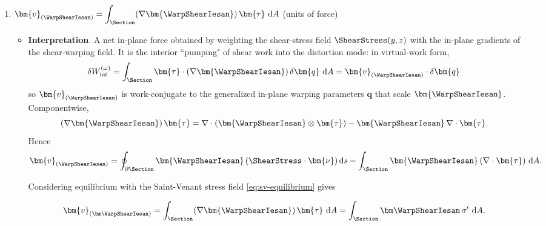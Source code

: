 \begin{enumerate}
So in view of the BVP for \(\bm\WarpShearIesan\) and the parameter \(\bm{b}_{\Section}\) fixed, \(\int_{\Section}G\,\nabla(\bm\WarpShearIesan\cdot\bm{b}_{\Section})\mathrm{~d}A = \left(\int_{\Section} E\, \bm{r}\otimes\bm{r}\mathrm{~d}A\right)\bm{b}_{\Section}\). 


\item \(\displaystyle \bm{v}_{(\WarpShearIesan)}=\int_{\Section}(\nabla\bm{\WarpShearIesan})\,\bm{\tau}\mathrm{~d}A\) (units of force) 
\begin{itemize}
\item \textbf{Interpretation}. A net in-plane force obtained by weighting the shear-stress field \(\ShearStress(y,z)\) with the in-plane gradients of the shear-warping field. 
It is the interior ``pumping" of shear work into the distortion mode: in virtual-work form,
  \[
  \delta W_{\text{int}}^{(\omega)}=\int_{\Section}\bm{\tau}\cdot(\nabla\bm{\WarpShearIesan})\,\delta\bm{q}\mathrm{~d}A
  =\bm{v}_{(\WarpShearIesan)}\cdot\delta\bm{q}\,
  \]
  so \(\bm{v}_{(\WarpShearIesan)}\) is work-conjugate to the generalized in-plane warping parameters \(\bm{q}\) that scale \(\bm{\WarpShearIesan}\). Componentwise,
  \[
  (\nabla\bm{\WarpShearIesan})\,\bm{\tau}
  = \nabla \cdot(\bm{\WarpShearIesan}\otimes\bm{\tau}) - \bm{\WarpShearIesan}\,\nabla \cdot\bm{\tau}.
  \]
  Hence
  \[
   \bm{v}_{(\WarpShearIesan)}=\oint_{\partial\Section} \bm{\WarpShearIesan}\,(\ShearStress \cdot \bm{\nu}) \,\mathrm{d}s
  -\int_{\Section}\bm{\WarpShearIesan}\,(\nabla \cdot\bm{\tau})\mathrm{~d}A.
  \]
  
Considering equilibrium with the Saint-Venant stress field \eqref{eq:sv-equilibrium} gives

\[
\bm{v}_{(\bm\WarpShearIesan)}=\int_{\Section}(\nabla\bm{\WarpShearIesan})\,\bm{\tau}\mathrm{~d}A
= \int_{\Section}\bm\WarpShearIesan\,\sigma'\mathrm{~d}A.
\]


\end{itemize}
\end{enumerate}
